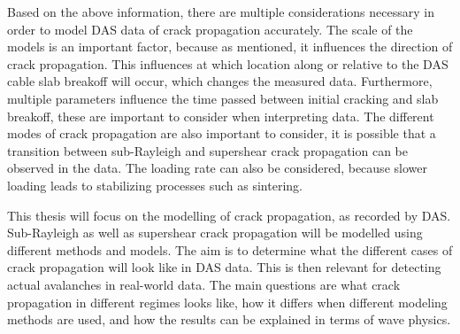 \documentclass[10pt]{article}
\begin{document}
  
  Based on the above information, there are multiple considerations necessary in order to model DAS data of crack propagation accurately. The scale of the models is an important factor, because as mentioned, it influences the direction of crack propagation. This influences at which location along or relative to the DAS cable slab breakoff will occur, which changes the measured data. Furthermore, multiple parameters influence the time passed between initial cracking and slab breakoff, these are important to consider when interpreting data. The different modes of crack propagation are also important to consider, it is possible that a transition between sub-Rayleigh and supershear crack propagation can be observed in the data. The loading rate can also be considered, because slower loading leads to stabilizing processes such as sintering. \par

  This thesis will focus on the modelling of crack propagation, as recorded by DAS. Sub-Rayleigh as well as supershear crack propagation will be modelled using different methods and models. The aim is to determine what the different cases of crack propagation will look like in DAS data. This is then relevant for detecting actual avalanches in real-world data. The main questions are what crack propagation in different regimes looks like, how it differs when different modeling methods are used, and how the results can be explained in terms of wave physics. \par


\end{document}
